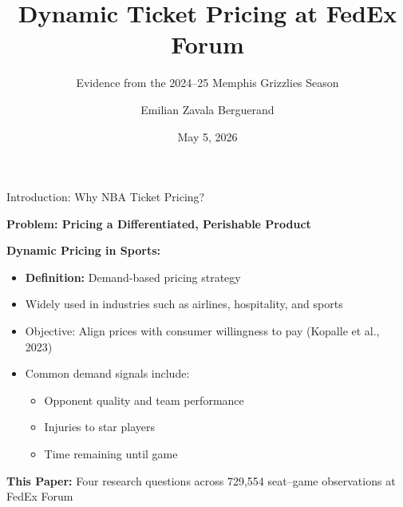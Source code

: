 \documentclass{beamer}
\title[Dynamic Ticket Pricing]{Dynamic Ticket Pricing at FedEx Forum}
\subtitle{Evidence from the 2024--25 Memphis Grizzlies Season}
\author{Emilian Zavala Berguerand}
\institute{University of Oklahoma \\ ECON 5253}
\date{May 5, 2026}
\begin{document}
\begin{frame}
\titlepage
\end{frame}

\begin{frame}{Introduction: Why NBA Ticket Pricing?}

\textbf{Problem: Pricing a Differentiated, Perishable Product}

\vspace{0.3cm}
\textbf{Dynamic Pricing in Sports:}
\begin{itemize}
    \item \textbf{Definition:} Demand-based pricing strategy
    \item Widely used in industries such as airlines, hospitality, and sports
    \item Objective: Align prices with consumer willingness to pay (Kopalle et al., 2023)
    \item Common demand signals include:
    \begin{itemize}
        \item Opponent quality and team performance
        \item Injuries to star players
        \item Time remaining until game
    \end{itemize}
\end{itemize}

\vspace{0.2cm}
\textbf{This Paper:} Four research questions across 729,554 seat--game observations at FedEx Forum

\end{frame}
\end{document}
